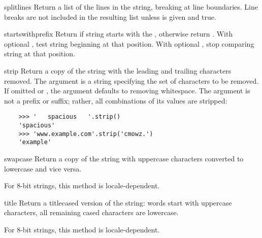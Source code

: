 \begin{methoddesc}[string]{splitlines}{}
Return a list of the lines in the string, breaking at line
boundaries.  Line breaks are not included in the resulting list unless
 is given and true.
\end{methoddesc}

\begin{methoddesc}[string]{startswith}{prefix}
Return  if string starts with the , otherwise
return .  With optional , test string beginning at
that position.  With optional , stop comparing string at that
position.
\end{methoddesc}

\begin{methoddesc}[string]{strip}{}
Return a copy of the string with the leading and trailing characters
removed.  The  argument is a string specifying the set of
characters to be removed.  If omitted or , the 
argument defaults to removing whitespace.  The  argument is not
a prefix or suffix; rather, all combinations of its values are stripped:
\begin{verbatim}
    >>> '   spacious   '.strip()
    'spacious'
    >>> 'www.example.com'.strip('cmowz.')
    'example'
\end{verbatim}
\end{methoddesc}

\begin{methoddesc}[string]{swapcase}{}
Return a copy of the string with uppercase characters converted to
lowercase and vice versa.

For 8-bit strings, this method is locale-dependent.
\end{methoddesc}

\begin{methoddesc}[string]{title}{}
Return a titlecased version of the string: words start with uppercase
characters, all remaining cased characters are lowercase.

For 8-bit strings, this method is locale-dependent.
\end{methoddesc}


